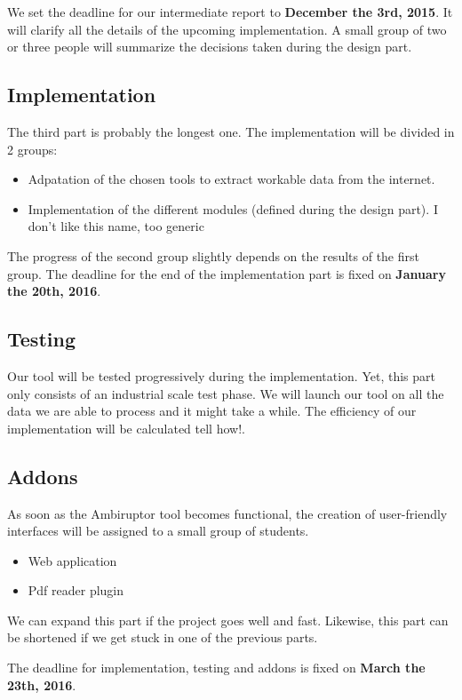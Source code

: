 \documentclass[11pt,a4paper]{article}
\newcommand{\red}[1]{{\color{red} #1}}
\begin{document}
We set the deadline for our intermediate report to \textbf{December the 3rd, 2015}. It will clarify all the details of the upcoming implementation. A small group of two or three people will summarize the decisions taken during the design part.

\subsection{Implementation}

The third part is probably the longest one. The implementation will be divided in 2 groups:
\begin{itemize}
	\item Adpatation of the chosen tools to extract workable data from the internet.
	\item Implementation of the different modules (defined during the design part). \red{I don't like this name, too generic}
\end{itemize}
The progress of the second group slightly depends on the results of the first group. The deadline for the end of the implementation part is fixed on \textbf{January the 20th, 2016}.

\subsection{Testing}

Our tool will be tested progressively during the implementation. Yet, this part only consists of an industrial scale test phase. We will launch our tool on all the data we are able to process and it might take a while. The efficiency of our implementation will be calculated \red{tell how!}. 

\subsection{Addons}

As soon as the Ambiruptor tool becomes functional, the creation of user-friendly interfaces will be assigned to a small group of students.
\begin{itemize}
	\item Web application
	\item Pdf reader plugin
\end{itemize}
We can expand this part if the project goes well and fast. Likewise, this part can be shortened if we get stuck in one of the previous parts.

\medskip
The deadline for implementation, testing and addons is fixed on \textbf{March the 23th, 2016}.
\end{document}
